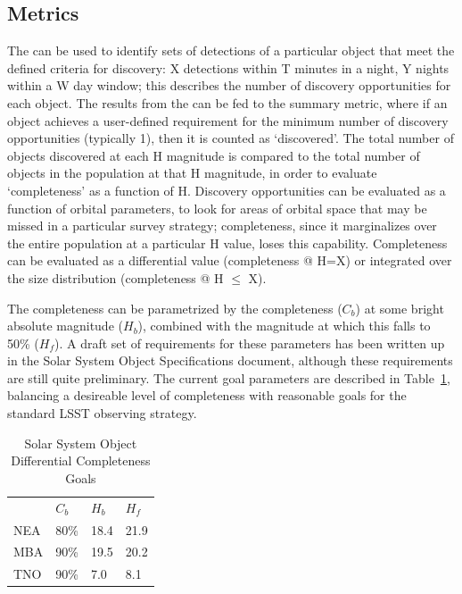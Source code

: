 
\subsection{Metrics}
\label{sec:\secname:metrics}

The  can be used to identify sets of
detections of a particular object that meet the defined criteria for
discovery: X detections within T minutes in a night, Y nights within a
W day window; this describes the number of discovery opportunities for
each object. The results from the  can be fed to the
 summary metric, where if an object achieves
a user-defined requirement for the minimum number of discovery
opportunities (typically 1), then it is counted as `discovered'.  The
total number of objects discovered at each H magnitude is compared to
the total number of objects in the population at that H magnitude, in
order to evaluate `completeness' as a function of H. Discovery
opportunities can be evaluated as a function of orbital parameters, to
look for areas of orbital space that may be missed in a particular
survey strategy; completeness, since it marginalizes over the entire
population at a particular H value, loses this
capability. Completeness can be evaluated as a differential value
(completeness @ H=X) or integrated over the size distribution
(completeness @ H $\leq$ X).

The completeness can be parametrized by the completeness ($C_b$) at
some bright absolute magnitude ($H_b$), combined with the magnitude at
which this falls to 50\% ($H_f$). A draft set of requirements for
these parameters has been written up in the Solar System Object
Specifications document, although these requirements are still quite
preliminary. The current goal parameters are described in Table~\ref{ssoreqs},
balancing a desireable level of completeness with reasonable goals for
the standard LSST observing strategy.

\begin{table}[]
\centering
\caption{Solar System Object Differential Completeness Goals}
\label{ssoreqs}
\begin{tabular}{llll}
    & $C_b$ & $H_b$ & $H_f$ \\
NEA & 80\%  & 18.4  & 21.9  \\
MBA & 90\%  & 19.5  & 20.2  \\
TNO & 90\%  & 7.0   & 8.1
\end{tabular}
\end{table}

